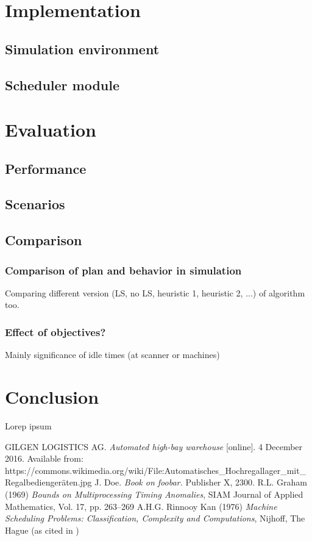 \documentclass{ctuthesis}
\begin{document}
\chapter{Implementation}
\section{Simulation environment}
\section{Scheduler module}
\chapter{Evaluation}
\label{ch:Evaluation}
\section{Performance}
\section{Scenarios}
\section{Comparison}
\subsection{Comparison of plan and behavior in simulation}
Comparing different version (LS, no LS, heuristic 1, heuristic 2, ...) of algorithm too.
\subsection{Effect of objectives?}
Mainly significance of idle times (at scanner or machines)
\chapter{Conclusion}

Lorep ipsum \cite{doe}

\begin{thebibliography}{1}
 GILGEN LOGISTICS AG. \emph{Automated high-bay warehouse} [online]. 4 December 2016. Available from: https://commons.wikimedia.org/wiki/File:Automatisches\_Hochregallager\_mit\_Regalbediengeräten.jpg
 J. Doe. \emph{Book on foobar.} Publisher X,
 2300.
  R.L. Graham (1969) \emph{Bounds on Multiprocessing Timing Anomalies}, SIAM
Journal of Applied Mathematics, Vol. 17, pp. 263–269
 A.H.G. Rinnooy Kan (1976) \emph{Machine Scheduling Problems: Classification,
Complexity and Computations}, Nijhoff, The Hague (as cited in \cite{pinedo})


\end{thebibliography}
\end{document}
